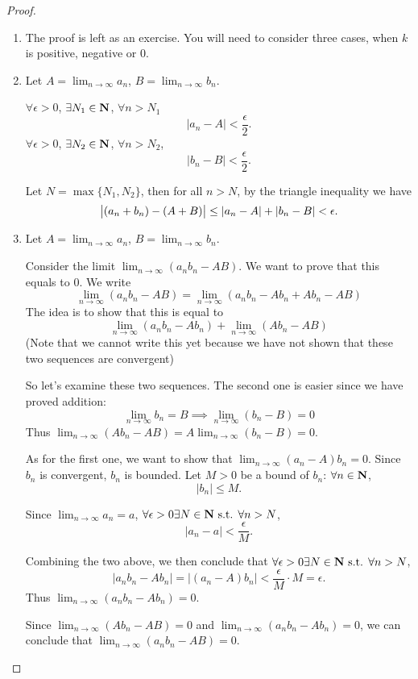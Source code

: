 \begin{proof} \
\begin{enumerate}[label=(\arabic*)]
\item The proof is left as an exercise. You will need to consider three cases, when $k$ is positive, negative or $0$.

\item Let $\displaystyle A=\lim_{n\to\infty}a_n$, $\displaystyle B=\lim_{n\to\infty}b_n$.

$\forall\epsilon>0$, $\exists N_1\in\mathbf N$, $\forall n>N_1$
\[ |a_n-A|<\frac{\epsilon}{2}. \]
$\forall\epsilon>0$, $\exists N_2\in\mathbf N$, $\forall n>N_2$, 
\[ |b_n-B|<\frac{\epsilon}{2}. \]

Let $N=\max\{N_1,N_2\}$, then for all $n>N$, by the triangle inequality we have
\[ \left|(a_n+b_n)-(A+B)\right|\le|a_n-A|+|b_n-B|<\epsilon. \]

\item Let $\displaystyle A=\lim_{n\to\infty}a_n$, $\displaystyle B=\lim_{n\to\infty}b_n$.

Consider the limit $\displaystyle\lim_{n\to\infty}(a_nb_n-AB)$. We want to prove that this equals to $0$. We write
\[ \lim_{n\to\infty}(a_nb_n-AB)=\lim_{n\to\infty}(a_nb_n-Ab_n+Ab_n-AB) \]
The idea is to show that this is equal to
\[ \lim_{n\to\infty}(a_nb_n-Ab_n)+\lim_{n\to\infty}(Ab_n-AB) \]
(Note that we cannot write this yet because we have not shown that these two sequences are convergent)

So let's examine these two sequences. The second one is easier since we have proved addition:
\[ \lim_{n\to\infty} b_n=B \implies \lim_{n\to\infty}(b_n-B)=0 \]
Thus $\displaystyle\lim_{n\to\infty}(Ab_n-AB)=A\lim_{n\to\infty}(b_n-B)=0$.

As for the first one, we want to show that $\displaystyle\lim_{n\to\infty}(a_n-A)b_n=0$. Since $b_n$ is convergent, $b_n$ is bounded. Let $M>0$ be a bound of $b_n$: $\forall n\in\mathbf N$,
\[|b_n|\le M.\]

Since $\displaystyle\lim_{n\to\infty} a_n=a$, $\forall\epsilon>0\exists N\in\mathbf N\text{ s.t. }\forall n>N$,
\[|a_n-a|<\frac{\epsilon}{M}.\]

Combining the two above, we then conclude that $\forall\epsilon>0\exists N\in\mathbf N\text{ s.t. }\forall n>N$,
\[ |a_nb_n-Ab_n|=|(a_n-A)b_n|<\frac{\epsilon}{M}\cdot M=\epsilon. \]
Thus $\displaystyle\lim_{n\to\infty}(a_nb_n-Ab_n)=0$.

Since $\displaystyle\lim_{n\to\infty}(Ab_n-AB)=0$ and $\displaystyle\lim_{n\to\infty}(a_nb_n-Ab_n)=0$, we can conclude that $\displaystyle\lim_{n\to\infty}(a_nb_n-AB)=0$.


\end{enumerate}
\end{proof}
